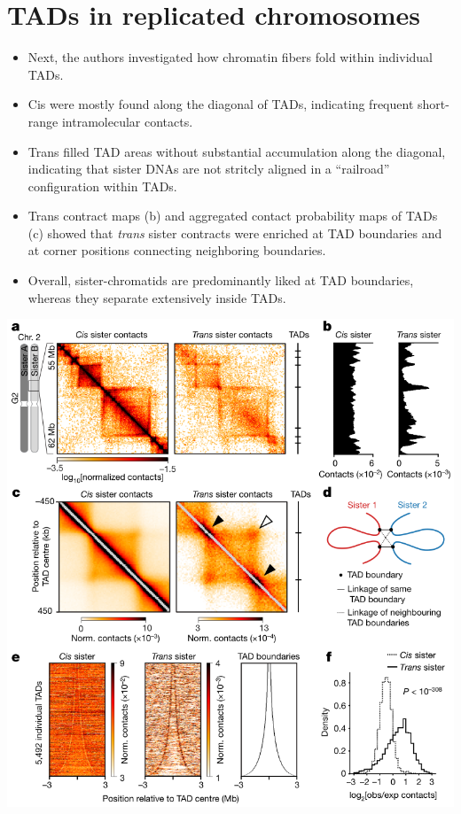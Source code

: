 \documentclass[plain,basic]{inVerba-notes}
\begin{document}
\section{TADs in replicated chromosomes}
\begin{itemize}
    \item Next, the authors investigated how chromatin fibers fold within individual TADs.
    \item Cis were mostly found along the diagonal of TADs, indicating frequent short-range intramolecular contacts.
    \item Trans filled TAD areas without substantial accumulation along the diagonal, indicating that sister DNAs are not stritcly aligned in a ``railroad'' configuration within TADs.
    \item Trans contract maps (b) and aggregated contact probability maps of TADs (c) showed that \textit{trans} sister contracts were enriched at TAD boundaries and at corner positions connecting neighboring boundaries.
    \item Overall, sister-chromatids are predominantly liked at TAD boundaries, whereas they separate extensively inside TADs.
\end{itemize}
\begin{center}
    \includegraphics[scale=0.5]{images/8-3.png}
\end{center}
\end{document}
